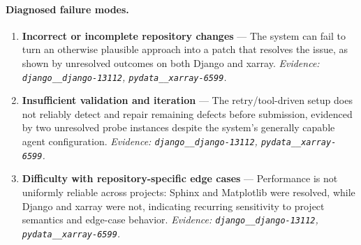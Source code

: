 \paragraph{Diagnosed failure modes.}\begin{enumerate}\itemsep1pt
\item \textbf{Incorrect or incomplete repository changes} --- The system can fail to turn an otherwise plausible approach into a patch that resolves the issue, as shown by unresolved outcomes on both Django and xarray. \emph{Evidence: \texttt{django\_\_django-13112}, \texttt{pydata\_\_xarray-6599}.}
\item \textbf{Insufficient validation and iteration} --- The retry/tool-driven setup does not reliably detect and repair remaining defects before submission, evidenced by two unresolved probe instances despite the system's generally capable agent configuration. \emph{Evidence: \texttt{django\_\_django-13112}, \texttt{pydata\_\_xarray-6599}.}
\item \textbf{Difficulty with repository-specific edge cases} --- Performance is not uniformly reliable across projects: Sphinx and Matplotlib were resolved, while Django and xarray were not, indicating recurring sensitivity to project semantics and edge-case behavior. \emph{Evidence: \texttt{django\_\_django-13112}, \texttt{pydata\_\_xarray-6599}.}
\end{enumerate}
